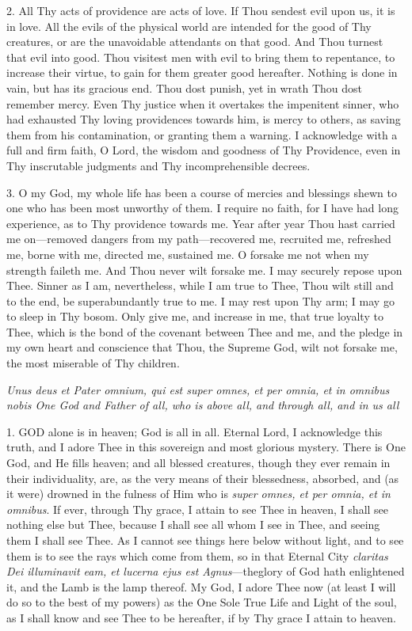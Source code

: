 2. All Thy acts of providence
are acts of love. If Thou sendest evil upon us, it is in love. All the
evils of the physical world are intended for the good of Thy creatures,
or are the unavoidable attendants on that good. And Thou turnest that
evil into good. Thou visitest men with evil to bring them to repentance,
to increase their virtue, to gain for them greater good hereafter.
Nothing is done in vain, but has its gracious end. Thou dost punish, yet
in wrath Thou dost remember mercy. Even Thy justice when it overtakes
the impenitent sinner, who had exhausted Thy loving providences towards
him, is mercy to others, as saving them from his contamination, or
granting them a warning. I acknowledge with a full and firm faith, O
Lord, the wisdom and goodness of Thy Providence, even in Thy inscrutable
judgments and Thy incomprehensible decrees.

3. O my God, my whole life has
been a course of mercies and blessings shewn to one who has been most
unworthy of them. I require no faith, for I have had long experience, as
to Thy providence towards me. Year after year Thou hast carried me
on—removed dangers from my path—recovered me, recruited me,
refreshed me, borne with me, directed me, sustained me. O forsake me not
when my strength faileth me. And Thou never wilt forsake me. I may
securely repose upon Thee. Sinner as I am, nevertheless, while I am true
to Thee, Thou wilt still and to the end, be superabundantly true to me.
I may rest upon Thy arm; I may go to sleep in Thy bosom. Only give
me, and increase in me, that true loyalty to Thee, which is the bond of
the covenant between Thee and me, and the pledge in my own heart and
conscience that Thou, the Supreme God, wilt not forsake me, the most
miserable of Thy children.


\emph{Unus
deus et Pater omnium, qui est super omnes, et per omnia, et in omnibus
nobis One God and Father of all, who is above all, and through all, and in us
all}

1. GOD
alone is in heaven; God is all in all. Eternal Lord, I acknowledge this
truth, and I adore Thee in this sovereign and most glorious mystery.
There is One God, and He fills heaven; and all blessed creatures, though
they ever remain in their individuality, are, as the very means of their
blessedness, absorbed, and (as it were) drowned in the fulness of Him
who is \emph{super omnes, et per omnia, et in omnibus}. If ever, through
Thy grace, I attain to see Thee in heaven, I shall see nothing else but
Thee, because I shall see all whom I see in Thee, and seeing them I
shall see Thee. As I cannot see things here below without light, and to
see them is to see the rays which come from them, so in that Eternal
City \emph{claritas Dei illuminavit eam, et lucerna ejus est Agnus}—the\emph{}glory of God hath enlightened it, and the Lamb is the lamp thereof.
My God, I adore Thee now (at least I will do so to the best of my
powers) as the One Sole True Life and Light of the soul, as I
shall know and see Thee to be hereafter, if by Thy grace I attain to
heaven.

